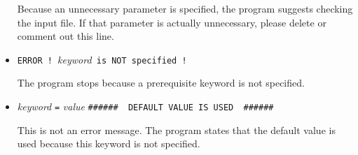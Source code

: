 \begin{itemize}
Because an unnecessary parameter is specified, the program suggests checking the input file.
If that parameter is actually unnecessary, please delete or comment out this line.

\item \verb|ERROR ! |\textit{keyword}\verb| is NOT specified !|

The program stops because a prerequisite keyword is not specified.

\item \textit{keyword} \verb|=| \textit{value} \verb|######  DEFAULT VALUE IS USED  ######|

This is not an error message.
The program states that the default value is used because this keyword is not specified.

\end{itemize}
 
